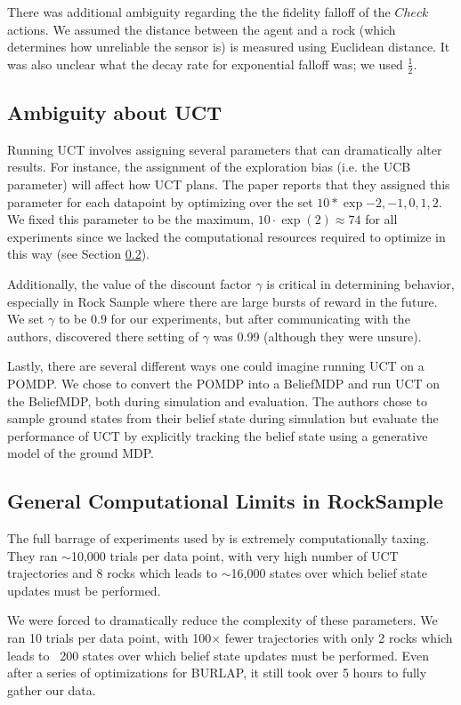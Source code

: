 \documentclass[11pt,twocolumn]{article}
\begin{document}
There was additional ambiguity regarding the the fidelity falloff of the $Check$ actions. We assumed the distance between the agent and a rock (which determines how unreliable the sensor is) is measured using Euclidean distance. It was also unclear what the decay rate for exponential falloff was; we used $\frac{1}{2}$.

\subsection{Ambiguity about UCT}

Running UCT involves assigning several parameters that can dramatically alter results. For instance, the assignment of the exploration bias (i.e. the UCB parameter) will affect how UCT plans. The paper reports that they assigned this parameter for each datapoint by optimizing over the set $10 * \exp{-2, -1, 0, 1, 2}$. We fixed this parameter to be the maximum, $10 \cdot \exp(2) \approx 74$ for all experiments since we lacked the computational resources required to optimize in this way (see Section \ref{sec: compLim}).

Additionally, the value of the discount factor $\gamma$ is critical in determining behavior, especially in Rock Sample where there are large bursts of reward in the future. We set $\gamma$ to be $0.9$ for our experiments, but after communicating with the authors, discovered there setting of $\gamma$ was 0.99 (although they were unsure). 

Lastly, there are several different ways one could imagine running UCT on a POMDP. We chose to convert the POMDP into a BeliefMDP and run UCT on the BeliefMDP, both during simulation and evaluation. The authors chose to sample ground states from their belief state during simulation but evaluate the performance of UCT by explicitly tracking the belief state using a generative model of the ground MDP.

\subsection{General Computational Limits in RockSample}
\label{sec: compLim}
The full barrage of experiments used by \cite{jiang2015dependence} is extremely computationally taxing. They ran $\sim$10,000 trials per data point, with very high number of UCT trajectories and 8 rocks which leads to $\sim$16,000 states over which belief state updates must be performed. 

We were forced to dramatically reduce the complexity of these parameters. We ran 10 trials per data point, with 100$\times$ fewer trajectories with only 2 rocks which leads to ~200 states over which belief state updates must be performed. Even after a series of optimizations for BURLAP, it still took over 5 hours to fully gather our data.




\end{document}
